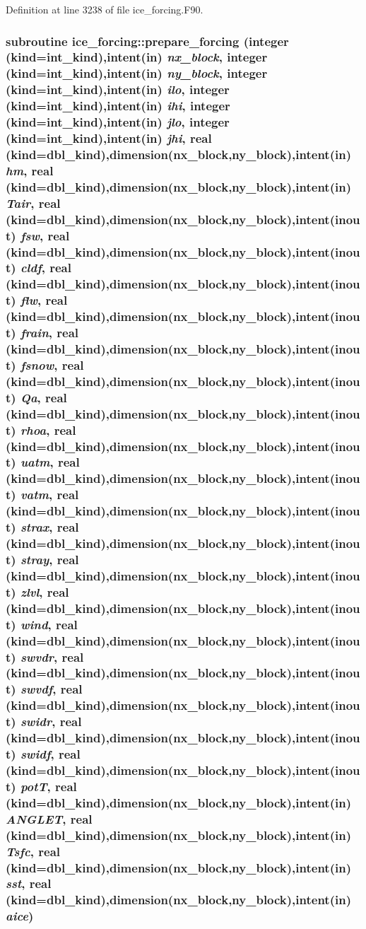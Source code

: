 Definition at line 3238 of file ice\_\-forcing.F90.\hypertarget{namespaceice__forcing_af5f411a97331efb9556841318e740684}{
\subsubsection[{prepare\_\-forcing}]{\setlength{\rightskip}{0pt plus 5cm}subroutine ice\_\-forcing::prepare\_\-forcing (integer (kind=int\_\-kind),intent(in) {\em nx\_\-block}, \/  integer (kind=int\_\-kind),intent(in) {\em ny\_\-block}, \/  integer (kind=int\_\-kind),intent(in) {\em ilo}, \/  integer (kind=int\_\-kind),intent(in) {\em ihi}, \/  integer (kind=int\_\-kind),intent(in) {\em jlo}, \/  integer (kind=int\_\-kind),intent(in) {\em jhi}, \/  real (kind=dbl\_\-kind),dimension(nx\_\-block,ny\_\-block),intent(in) {\em hm}, \/  real (kind=dbl\_\-kind),dimension(nx\_\-block,ny\_\-block),intent(in) {\em Tair}, \/  real (kind=dbl\_\-kind),dimension(nx\_\-block,ny\_\-block),intent(inout) {\em fsw}, \/  real (kind=dbl\_\-kind),dimension(nx\_\-block,ny\_\-block),intent(inout) {\em cldf}, \/  real (kind=dbl\_\-kind),dimension(nx\_\-block,ny\_\-block),intent(inout) {\em flw}, \/  real (kind=dbl\_\-kind),dimension(nx\_\-block,ny\_\-block),intent(inout) {\em frain}, \/  real (kind=dbl\_\-kind),dimension(nx\_\-block,ny\_\-block),intent(inout) {\em fsnow}, \/  real (kind=dbl\_\-kind),dimension(nx\_\-block,ny\_\-block),intent(inout) {\em Qa}, \/  real (kind=dbl\_\-kind),dimension(nx\_\-block,ny\_\-block),intent(inout) {\em rhoa}, \/  real (kind=dbl\_\-kind),dimension(nx\_\-block,ny\_\-block),intent(inout) {\em uatm}, \/  real (kind=dbl\_\-kind),dimension(nx\_\-block,ny\_\-block),intent(inout) {\em vatm}, \/  real (kind=dbl\_\-kind),dimension(nx\_\-block,ny\_\-block),intent(inout) {\em strax}, \/  real (kind=dbl\_\-kind),dimension(nx\_\-block,ny\_\-block),intent(inout) {\em stray}, \/  real (kind=dbl\_\-kind),dimension(nx\_\-block,ny\_\-block),intent(inout) {\em zlvl}, \/  real (kind=dbl\_\-kind),dimension(nx\_\-block,ny\_\-block),intent(inout) {\em wind}, \/  real (kind=dbl\_\-kind),dimension(nx\_\-block,ny\_\-block),intent(inout) {\em swvdr}, \/  real (kind=dbl\_\-kind),dimension(nx\_\-block,ny\_\-block),intent(inout) {\em swvdf}, \/  real (kind=dbl\_\-kind),dimension(nx\_\-block,ny\_\-block),intent(inout) {\em swidr}, \/  real (kind=dbl\_\-kind),dimension(nx\_\-block,ny\_\-block),intent(inout) {\em swidf}, \/  real (kind=dbl\_\-kind),dimension(nx\_\-block,ny\_\-block),intent(inout) {\em potT}, \/  real (kind=dbl\_\-kind),dimension(nx\_\-block,ny\_\-block),intent(in) {\em ANGLET}, \/  real (kind=dbl\_\-kind),dimension(nx\_\-block,ny\_\-block),intent(in) {\em Tsfc}, \/  real (kind=dbl\_\-kind),dimension(nx\_\-block,ny\_\-block),intent(in) {\em sst}, \/  real (kind=dbl\_\-kind),dimension(nx\_\-block,ny\_\-block),intent(in) {\em aice})}}
\label{namespaceice__forcing_af5f411a97331efb9556841318e740684}


